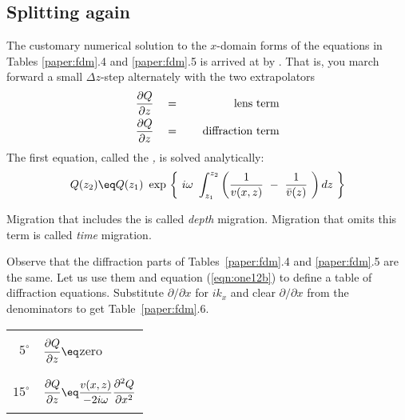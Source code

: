 {\subsection{Splitting again}
The customary numerical solution to the  $x$-domain forms of the equations
in Tables \ref{paper:fdm}.4 and \ref{paper:fdm}.5 is arrived at by .
That is, you march forward a small  $ \Delta z $-step alternately
with the two extrapolators
\begin{eqnarray}
{ \partial Q   \over  \partial z } \ \  \ &=&\  \ \  \ \rm{lens\ term}
\label{eqn:one12a}
\\
{ \partial Q   \over  \partial z } \ \  \ &=&\  \ \  \ \rm{diffraction\ term}
\label{eqn:one12b}
\end{eqnarray}
The first equation, called the 
{\em 
{},
}
is solved analytically: 
\begin{equation}
Q ( z_2 ) \eq  Q ( z_1 ) \  \exp \,
\left\{ \  i \omega \ \int_{{z}_1}^{{z}_2}
\left( {1 \over  v(x,z)} \ -\ 
{1 \over \bar v ( z ) } \  \right) dz \  \right\}
\label{eqn:one13}
\end{equation}
\par
Migration that includes the 
is called %
{\em  depth %
} migration.
Migration that omits this term is called 
{\em  time %
} migration.
\par
Observe that the diffraction parts
of Tables~\ref{paper:fdm}.4 and \ref{paper:fdm}.5 are the same.
Let us use them and equation (\ref{eqn:one12b}) to
define a table of diffraction equations.
Substitute  $  \partial / \partial x $  for  $ i k_x $  and
clear  $  \partial / \partial x  $  from the denominators to
get Table~\ref{paper:fdm}.6.
\begin{table}
\begin{center}
\begin{tabular}{|r|l|}     \hline
     &       \\
$5^\circ$ & $ \displaystyle {\strut\partial Q\over
            \partial z}\eq $zero  \\
     &        \\   \hline
     &        \\
$15^\circ$ & $ \displaystyle {\strut\partial Q\over
             \partial z} \eq 
             \displaystyle {v(x, z)\over - 2i\omega}
              {\strut\partial^2 Q\over\partial x^2}$ \\
     &        \\      \hline

\end{tabular}
\end{center}
\end{table}}
